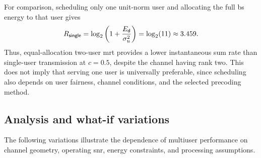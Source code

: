 For comparison, scheduling only one unit-norm user and allocating the full \ac{bs} energy to that user gives
\begin{equation*}
	R_{\mathsf{single}}
	=\log_2\left(1+\frac{E_{\mathsf{d}}}{\sigma_u^2}\right)
	=\log_2(11)\approx3.459.
\end{equation*}
Thus, equal-allocation two-user \ac{mrt} provides a lower instantaneous sum rate than single-user transmission at $c=0.5$, despite the channel having rank two. This does not imply that serving one user is universally preferable, since scheduling also depends on user fairness, channel conditions, and the selected precoding method.

\subsection{Analysis and what-if variations}
The following variations illustrate the dependence of multiuser performance on channel geometry, operating \ac{snr}, energy constraints, and processing assumptions.

